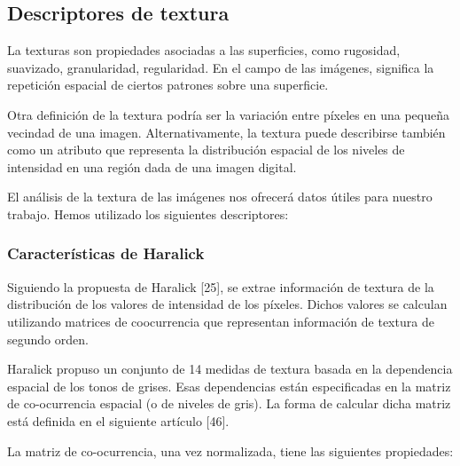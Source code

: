 \subsection{Descriptores de textura}
La texturas son propiedades asociadas a las superficies, como rugosidad, suavizado, granularidad, regularidad. En el campo de las imágenes, significa la repetición espacial de ciertos patrones sobre una superficie.

Otra definición de la textura podría ser la variación entre píxeles en una pequeña vecindad de una imagen. Alternativamente, la textura puede describirse también como un atributo que representa la distribución espacial de los niveles de intensidad en una región dada de una imagen digital.


El análisis de la textura de las imágenes nos ofrecerá datos útiles para nuestro trabajo. Hemos utilizado los siguientes descriptores:

\subsubsection*{Características de Haralick}
Siguiendo la propuesta de Haralick [25], se extrae información de textura de la distribución de los valores de intensidad de los píxeles. Dichos valores se calculan utilizando matrices de coocurrencia que representan información de textura de segundo orden.

Haralick propuso un conjunto de 14 medidas de textura basada en la dependencia espacial de los tonos de grises. Esas dependencias están especificadas en la matriz de co-ocurrencia espacial (o de niveles de gris). La forma de calcular dicha matriz está definida en el siguiente artículo [46].

La matriz de co-ocurrencia, una vez normalizada, tiene las siguientes propiedades:

